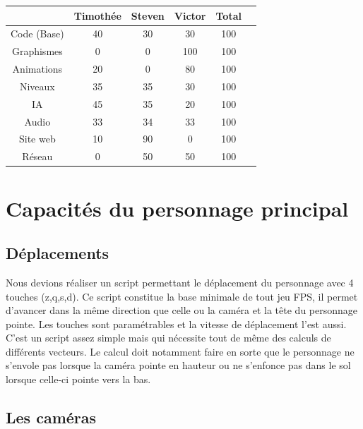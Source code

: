 \documentclass[12pt]{article}
\begin{document}
\begin{tabular}{|c|c|c|c|c|c|}
\hline
 & Timothée & Steven & Victor & Total\\
\hline
Code (Base) & 40 & 30 & 30 & 100\\
\hline
Graphismes & 0 & 0 & 100 & 100\\
\hline
Animations & 20 & 0 & 80 & 100\\
\hline
Niveaux & 35 & 35 & 30 & 100\\
\hline
IA & 45 & 35 & 20 & 100\\
\hline
Audio & 33 & 34 & 33 & 100\\
\hline
Site web & 10 & 90 & 0 & 100\\
\hline
Réseau & 0 & 50 & 50 & 100\\
\hline
\end{tabular}

\section{Capacités du personnage principal}

\subsection{Déplacements}

Nous devions réaliser un script permettant le déplacement du personnage avec 4 touches (z,q,s,d). Ce script constitue la base minimale de tout jeu FPS, il permet d’avancer dans la même direction que celle ou la caméra et la tête du personnage pointe. Les touches sont paramétrables et la vitesse de déplacement l’est aussi.\\
C’est un script assez simple mais qui nécessite tout de même des calculs de différents vecteurs. Le calcul doit notamment faire en sorte que le personnage ne s’envole pas lorsque la caméra pointe en hauteur ou ne s’enfonce pas dans le sol lorsque celle-ci pointe vers la bas.

\subsection{Les caméras}
\end{document}
